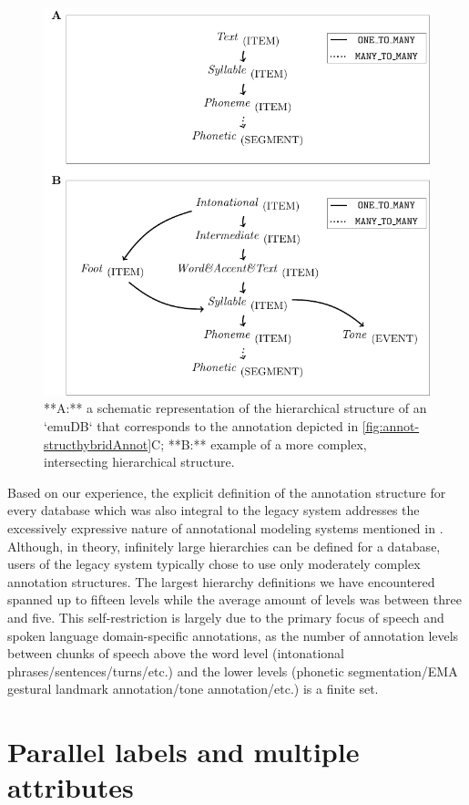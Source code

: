 \documentclass[]{book}
\theoremstyle{definition}
\theoremstyle{definition}
\theoremstyle{definition}
\theoremstyle{remark}
\begin{document}
\begin{figure}

{\centering \includegraphics[width=0.75\linewidth]{pics/annotStruct} 

}

\caption{**A:** a schematic representation of the hierarchical structure of an `emuDB` that corresponds to the annotation depicted in \ref{fig:annot-structhybridAnnot}C; **B:** example of a more complex, intersecting hierarchical structure.}\label{fig:annotStruct}
\end{figure}

Based on our experience, the explicit definition of the annotation
structure for every database which was also integral to the legacy
system addresses the excessively expressive nature of annotational
modeling systems mentioned in \citet{bird:sc2001a}. Although, in theory,
infinitely large hierarchies can be defined for a database, users of the
legacy system typically chose to use only moderately complex annotation
structures. The largest hierarchy definitions we have encountered
spanned up to fifteen levels while the average amount of levels was
between three and five. This self-restriction is largely due to the
primary focus of speech and spoken language domain-specific annotations,
as the number of annotation levels between chunks of speech above the
word level (intonational phrases/sentences/turns/etc.) and the lower
levels (phonetic segmentation/EMA gestural landmark annotation/tone
annotation/etc.) is a finite set.

\hypertarget{parallel-labels-and-multiple-attributes}{%
\section{Parallel labels and multiple
attributes}\label{parallel-labels-and-multiple-attributes}}
\end{document}
